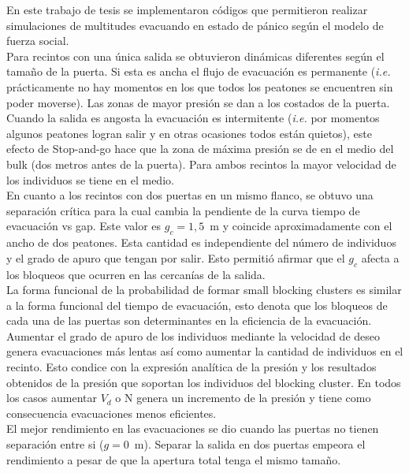 En este trabajo de tesis se implementaron códigos que permitieron realizar simulaciones de multitudes evacuando en estado de pánico según el modelo de fuerza social. \\

Para recintos con una única salida se obtuvieron dinámicas diferentes según el tamaño de la puerta. Si esta es ancha el flujo de evacuación es permanente (\emph{i.e.} prácticamente no hay momentos en los que todos los peatones se encuentren sin poder moverse). Las zonas de mayor presión se dan a los costados de la puerta. Cuando la salida es angosta la evacuación es intermitente (\emph{i.e.} por momentos algunos peatones logran salir y en otras ocasiones todos están quietos), este efecto de Stop-and-go hace que la zona de máxima presión se de en el medio del bulk (dos metros antes de la puerta). 
Para ambos recintos la mayor velocidad de los individuos se tiene en el medio. \\

En cuanto a los recintos con dos puertas en un mismo flanco, se obtuvo  una separación crítica para la cual cambia la pendiente de la curva tiempo de evacuación vs gap. Este valor es $g_c=1,5$~m y coincide aproximadamente con el ancho de dos peatones. Esta cantidad es independiente del número de individuos y el grado de apuro que tengan por salir. Esto permitió afirmar que el $g_c$ afecta a los bloqueos que ocurren en las cercanías de la salida. \\

La forma funcional de la probabilidad de formar small blocking clusters es similar a la forma funcional del tiempo de evacuación, esto denota que los bloqueos de cada una de las puertas son determinantes en la eficiencia de la evacuación. \\

Aumentar el grado de apuro de los individuos mediante la velocidad de deseo genera evacuaciones más lentas así como aumentar la cantidad de individuos en el recinto. Esto condice con la expresión analítica de la presión y los resultados obtenidos de la presión que soportan los individuos del blocking cluster. En todos los casos aumentar $V_d$ o N genera un incremento de la presión y tiene como consecuencia evacuaciones menos eficientes.\\

El mejor rendimiento en las evacuaciones se dio cuando las puertas no tienen separación entre si ($g=0$~m). Separar la salida en dos puertas empeora el rendimiento a pesar de que la apertura total tenga el mismo tamaño.   
